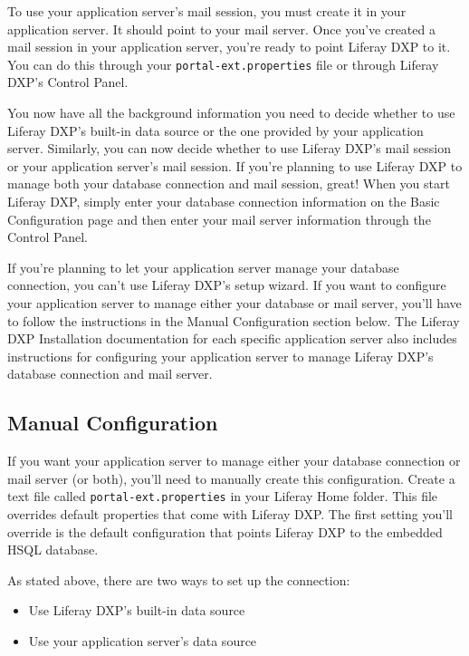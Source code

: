 To use your application server's mail session, you must create it in
your application server. It should point to your mail server. Once
you've created a mail session in your application server, you're ready
to point Liferay DXP to it. You can do this through your
\texttt{portal-ext.properties} file or through Liferay DXP's Control
Panel.

You now have all the background information you need to decide whether
to use Liferay DXP's built-in data source or the one provided by your
application server. Similarly, you can now decide whether to use Liferay
DXP's mail session or your application server's mail session. If you're
planning to use Liferay DXP to manage both your database connection and
mail session, great! When you start Liferay DXP, simply enter your
database connection information on the Basic Configuration page and then
enter your mail server information through the Control Panel.

If you're planning to let your application server manage your database
connection, you can't use Liferay DXP's setup wizard. If you want to
configure your application server to manage either your database or mail
server, you'll have to follow the instructions in the Manual
Configuration section below. The Liferay DXP Installation documentation
for each specific application server also includes instructions for
configuring your application server to manage Liferay DXP's database
connection and mail server.

\subsection{Manual Configuration}\label{manual-configuration}

If you want your application server to manage either your database
connection or mail server (or both), you'll need to manually create this
configuration. Create a text file called \texttt{portal-ext.properties}
in your Liferay Home folder. This file overrides default properties that
come with Liferay DXP. The first setting you'll override is the default
configuration that points Liferay DXP to the embedded HSQL database.

As stated above, there are two ways to set up the connection:

\begin{itemize}
\tightlist
\item
  Use Liferay DXP's built-in data source
\item
  Use your application server's data source
\end{itemize}

